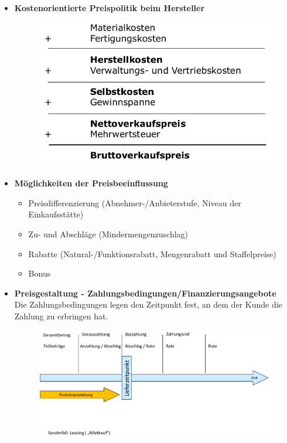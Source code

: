 \documentclass[a4paper,11pt, twoside]{article}
\begin{document}
\begin{itemize}
	\item \textbf{Kostenorientierte Preispolitik beim Hersteller}
\begin{figure}[h]
 \begin{center}
   \includegraphics[scale=0.3]{bilder/kostenorientierte_preispolitik2.png}
 \end{center}
\end{figure}

	\item \textbf{Möglichkeiten der Preisbeeinflussung}
\begin{itemize}
	\item Preisdifferenzierung (Abnehmer-/Anbieterstufe, Niveau der Einkaufsstätte)
	\item Zu- und Abschläge (Mindermengenzuschlag)
	\item Rabatte (Natural-/Funktionsrabatt, Mengenrabatt und Staffelpreise)
	\item Bonus
\end{itemize}

	\item \textbf{Preisgestaltung - Zahlungsbedingungen/Finanzierungsangebote}\\
Die Zahlungsbedingungen legen den Zeitpunkt fest, an dem der Kunde die Zahlung zu erbringen hat.
\begin{figure}[h]
 \begin{center}
   \includegraphics[scale=0.3]{bilder/preisgestaltung.png}
 \end{center}
\end{figure}


\end{itemize}
\end{document}

